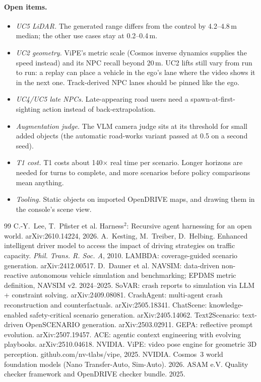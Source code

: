 \documentclass[10pt,a4paper]{article}
\begin{document}
\paragraph{Open items.}
\begin{itemize}[leftmargin=1.4em,itemsep=0pt]
\item \emph{UC5 LiDAR.} The generated range differs from the control by 4.2--4.8\,m median; the other use cases
  stay at 0.2--0.4\,m.
\item \emph{UC2 geometry.} ViPE's metric scale (Cosmos inverse dynamics supplies the speed instead) and its NPC
  recall beyond 20\,m. UC2 lifts still vary from run to run: a replay can place a vehicle in the ego's lane where
  the video shows it in the next one. Track-derived NPC lanes should be pinned like the ego.
\item \emph{UC4/UC5 late NPCs.} Late-appearing road users need a spawn-at-first-sighting action instead of
  back-extrapolation.
\item \emph{Augmentation judge.} The VLM camera judge sits at its threshold for small added objects (the automatic
  road-works variant passed at 0.5 on a second seed).
\item \emph{T1 cost.} T1 costs about 140$\times$ real time per scenario. Longer horizons are needed for turns to
  complete, and more scenarios before policy comparisons mean anything.
\item \emph{Tooling.} Static objects on imported OpenDRIVE maps, and drawing them in the console's scene view.
\end{itemize}

\begin{thebibliography}{99}\small
{} C.-Y.~Lee, T.~Pfister et al. Harness$^2$: Recursive agent harnessing for an open world. arXiv:2610.14224, 2026.
 A.~Kesting, M.~Treiber, D.~Helbing. Enhanced intelligent driver model to access the impact of driving strategies on traffic capacity. \emph{Phil. Trans. R. Soc. A}, 2010.
 LAMBDA: coverage-guided scenario generation. arXiv:2412.00517.
 D.~Dauner et al. NAVSIM: data-driven non-reactive autonomous vehicle simulation and benchmarking; EPDMS metric definition, NAVSIM v2. 2024--2025.
 SoVAR: crash reports to simulation via LLM + constraint solving. arXiv:2409.08081.
 CrashAgent: multi-agent crash reconstruction and counterfactuals. arXiv:2505.18341.
 ChatScene: knowledge-enabled safety-critical scenario generation. arXiv:2405.14062.
 Text2Scenario: text-driven OpenSCENARIO generation. arXiv:2503.02911.
 GEPA: reflective prompt evolution. arXiv:2507.19457.
 ACE: agentic context engineering with evolving playbooks. arXiv:2510.04618.
 NVIDIA. ViPE: video pose engine for geometric 3D perception. github.com/nv-tlabs/vipe, 2025.
 NVIDIA. Cosmos~3 world foundation models (Nano Transfer-Auto, Sim-Auto). 2026.
 ASAM e.V. Quality checker framework and OpenDRIVE checker bundle. 2025.
\end{thebibliography}
\end{document}
